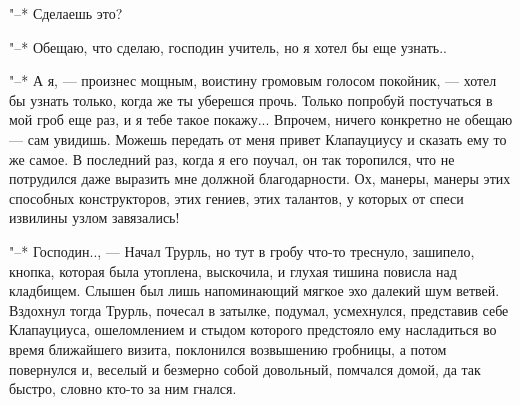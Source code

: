 "--* Сделаешь это?

"--* Обещаю, что сделаю, господин учитель, но я хотел
бы еще узнать..

"--* А я, --- произнес мощным, воистину громовым голосом
покойник, --- хотел бы узнать только, когда же ты уберешся
прочь. Только попробуй постучаться в мой гроб еще раз, и я
тебе такое покажу... Впрочем, ничего конкретно не обещаю --- сам
увидишь. Можешь передать от меня привет Клапауциусу и
сказать ему то же самое. В последний раз, когда я его
поучал, он так торопился, что не потрудился даже выразить
мне должной благодарности. Ох, манеры, манеры этих способных
конструкторов, этих гениев, этих талантов, у которых от
спеси извилины узлом завязались!

"--*  Господин..,  ---  Начал  Трурль,  но тут  в  гробу  что-то  треснуло,
зашипело, кнопка,  которая была  утоплена, выскочила, и  глухая тишина
повисла  над  кладбищем.  Слышен  был  лишь  напоминающий  мягкое  эхо
далекий  шум  ветвей.  Вздохнул   тогда  Трурль,  почесал  в  затылке,
подумал,  усмехнулся,  представив  себе  Клапауциуса,  ошеломлением  и
стыдом которого предстояло ему насладиться во время ближайшего визита,
поклонился  возвышению  гробницы,  а  потом повернулся  и,  веселый  и
безмерно собой довольный, помчался домой, да так быстро, словно кто-то
за ним гнался.
